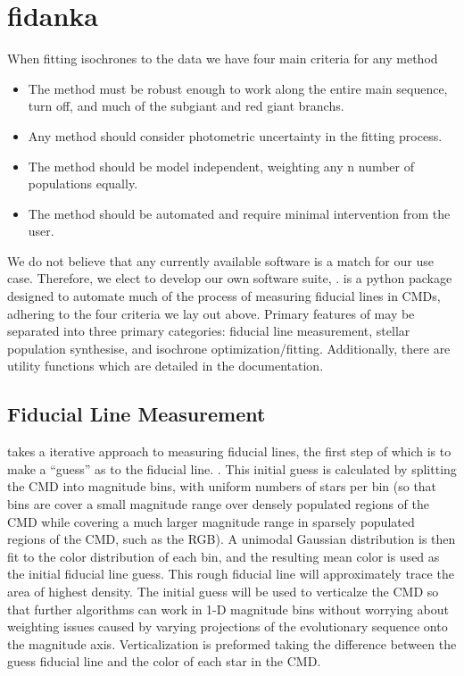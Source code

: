 \section{fidanka}\label{sec:fidanka}
When fitting isochrones to the data we have four main criteria for any method

\begin{itemize}
	\item The method must be robust enough to work along the entire main sequence, turn off, and much of the subgiant and red giant branchs.
	\item Any method should consider photometric uncertainty in the fitting process.
	\item The method should be model independent, weighting any n number of populations equally.
	\item The method should be automated and require minimal intervention from the user.
\end{itemize}


We do not believe that any currently available software is a match for
our use case. Therefore, we elect to develop our own software suite, \fidanka.
\fidanka is a python package designed to automate much of the process of
measuring fiducial lines in CMDs, adhering to the four criteria we lay out
above. Primary features of \fidanka may be separated into three primary
categories: fiducial line measurement, stellar population synthesise, and
isochrone optimization/fitting. Additionally, there are utility functions which
are detailed in the \fidanka documentation.

\subsection{Fiducial Line Measurement}
\fidanka takes a iterative approach to measuring fiducial lines, the first step
of which is to make a ``guess'' as to the fiducial line. . This initial guess
is calculated by splitting the CMD into magnitude bins, with uniform numbers of
stars per bin (so that bins are cover a small magnitude range over densely
populated regions of the CMD while covering a much larger magnitude range in
sparsely populated regions of the CMD, such as the RGB). A unimodal Gaussian
distribution is then fit to the color distribution of each bin, and the
resulting mean color is used as the initial fiducial line guess. This rough
fiducial line will approximately trace the area of highest density. The initial
guess will be used to verticalze the CMD so that further algorithms can work in
1-D magnitude bins without worrying about weighting issues caused by varying
projections of the evolutionary sequence onto the magnitude axis.
Verticalization is preformed taking the difference between the guess fiducial
line and the color of each star in the CMD.


